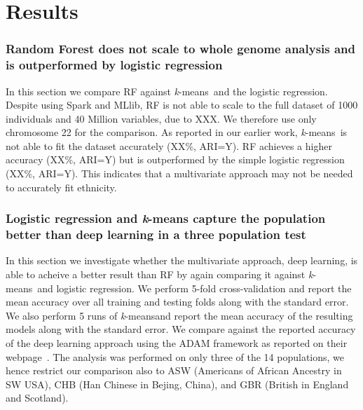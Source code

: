 \documentclass{llncs}
\newcommand{\kMeans}{\textit{k}-means}
\begin{document}
{%
\section{Results}

\subsubsection{Random Forest does not scale to whole genome analysis and is outperformed by logistic regression}
In this section we compare RF against \kMeans\ and the logistic regression.
Despite using {\sc Spark} and {\s MLlib}, RF is not able to scale to the full dataset of 1000 individuals and 40 Million variables, due to XXX. 
We therefore use only chromosome 22 for the comparison.
As reported in our earlier work, \kMeans\ is not able to fit the dataset accurately (XX\%, ARI=Y). 
RF achieves a higher accuracy (XX\%, ARI=Y) but is outperformed by the simple logistic regression (XX\%, ARI=Y).
This indicates that a multivariate approach may not be needed to accurately fit ethnicity. 


\subsubsection{Logistic regression and \kMeans{} capture the population better than deep learning in a three population test}
In this section we investigate whether the multivariate approach, deep learning, is able to acheive a better result than RF by again comparing it against \kMeans\ and logistic regression.  
We perform 5-fold cross-validation and report the mean accuracy over all training and testing folds along with the standard error.
We also perform 5 runs of \kMeans and report the mean accuracy of the resulting models along with the standard error. 
We compare against the reported accuracy of the deep learning approach using the ADAM framework as reported on their webpage~\cite{Ferguson}. 
The analysis was performed on only three of the 14 populations, we hence restrict our comparison also to ASW (Americans of African Ancestry in SW USA), CHB (Han Chinese in Bejing, China), and GBR (British in England and Scotland).

}
\end{document}
